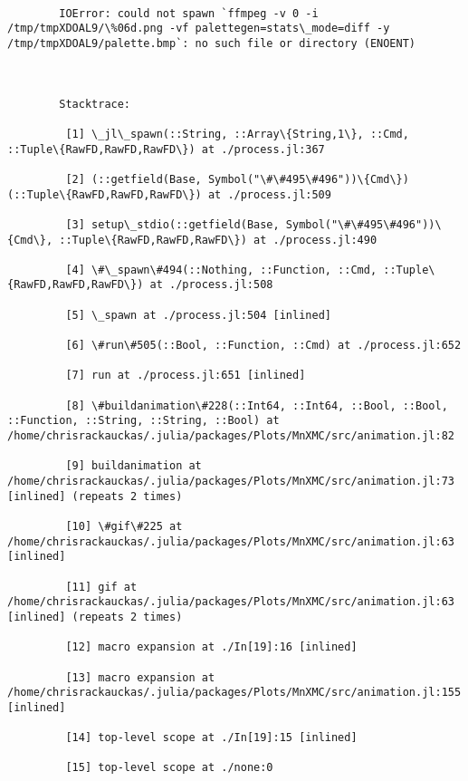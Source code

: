 \documentclass[11pt]{article}
\begin{document}
    \begin{Verbatim}[commandchars=\\\{\}]

        IOError: could not spawn `ffmpeg -v 0 -i /tmp/tmpXDOAL9/\%06d.png -vf palettegen=stats\_mode=diff -y /tmp/tmpXDOAL9/palette.bmp`: no such file or directory (ENOENT)

        

        Stacktrace:

         [1] \_jl\_spawn(::String, ::Array\{String,1\}, ::Cmd, ::Tuple\{RawFD,RawFD,RawFD\}) at ./process.jl:367

         [2] (::getfield(Base, Symbol("\#\#495\#496"))\{Cmd\})(::Tuple\{RawFD,RawFD,RawFD\}) at ./process.jl:509

         [3] setup\_stdio(::getfield(Base, Symbol("\#\#495\#496"))\{Cmd\}, ::Tuple\{RawFD,RawFD,RawFD\}) at ./process.jl:490

         [4] \#\_spawn\#494(::Nothing, ::Function, ::Cmd, ::Tuple\{RawFD,RawFD,RawFD\}) at ./process.jl:508

         [5] \_spawn at ./process.jl:504 [inlined]

         [6] \#run\#505(::Bool, ::Function, ::Cmd) at ./process.jl:652

         [7] run at ./process.jl:651 [inlined]

         [8] \#buildanimation\#228(::Int64, ::Int64, ::Bool, ::Bool, ::Function, ::String, ::String, ::Bool) at /home/chrisrackauckas/.julia/packages/Plots/MnXMC/src/animation.jl:82

         [9] buildanimation at /home/chrisrackauckas/.julia/packages/Plots/MnXMC/src/animation.jl:73 [inlined] (repeats 2 times)

         [10] \#gif\#225 at /home/chrisrackauckas/.julia/packages/Plots/MnXMC/src/animation.jl:63 [inlined]

         [11] gif at /home/chrisrackauckas/.julia/packages/Plots/MnXMC/src/animation.jl:63 [inlined] (repeats 2 times)

         [12] macro expansion at ./In[19]:16 [inlined]

         [13] macro expansion at /home/chrisrackauckas/.julia/packages/Plots/MnXMC/src/animation.jl:155 [inlined]

         [14] top-level scope at ./In[19]:15 [inlined]

         [15] top-level scope at ./none:0

    \end{Verbatim}
\end{document}
